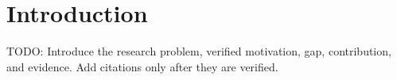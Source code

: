 \section{Introduction}

TODO: Introduce the research problem, verified motivation, gap, contribution, and evidence. Add citations only after they are verified.
